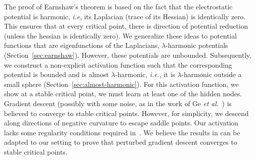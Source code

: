 
The proof of Earnshaw's theorem is based on the fact that the electrostatic potential is harmonic, \emph{i.e}, its Laplacian (trace of its Hessian) is identically zero. This ensures that at every critical point, there is direction of potential reduction (unless the hessian is identically zero). We generalize these ideas to potential functions that are eigenfunctions of the Laplacians, $\lambda$-harmonic potentials (Section~\ref{sec:earnshaw}). However, these potentials are unbounded. Subsequently, we construct a non-explicit activation function such that the corresponding potential is bounded and is almost $\lambda$-harmonic, \emph{i.e.}, it is $\lambda$-harmonic outside a small sphere (Section~\ref{sec:almost-harmonic}). For this activation function, we show at a stable critical point, we must learn at least one of the hidden nodes. Gradient descent (possibly with some noise, as in the work of Ge \emph{et al.}~\cite{GeHJY15}) is believed to converge to stable critical points. However, for simplicity, we descend along directions of negative curvature to escape saddle points. Our activation lacks some regularity conditions required in~\cite{GeHJY15}. We believe the results in \cite{jin2017escape} can be adapted to our setting to prove that perturbed gradient descent converges to stable critical points.





